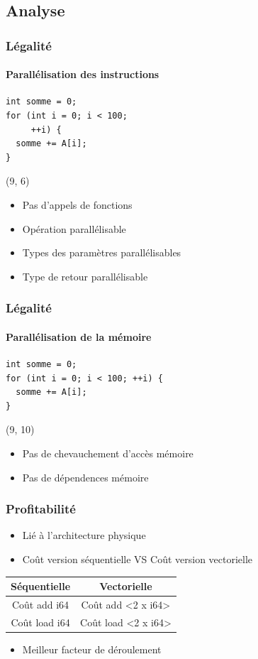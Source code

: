 \documentclass{beamer}
\begin{document}
\subsection{Analyse}
\begin{frame}[fragile]
\frametitle{Légalité}
\framesubtitle{Parallélisation des instructions}
\begin{lstlisting}
int somme = 0;
for (int i = 0; i < 100;
     ++i) {
  somme += A[i];
}
\end{lstlisting}

\begin{textblock}{6}(9, 6)
	\begin{itemize}
	\item<2->[\checkmark] Pas d'appels de fonctions
	\item<3->[\checkmark] Opération parallélisable
	\item<4->[\checkmark] Types des paramètres parallélisables
	\item<5->[\checkmark] Type de retour parallélisable
	\end{itemize}
\end{textblock}
\end{frame}

\begin{frame}[fragile]
\frametitle{Légalité}
\framesubtitle{Parallélisation de la mémoire}
\begin{lstlisting}
int somme = 0;
for (int i = 0; i < 100; ++i) {
  somme += A[i];
}
\end{lstlisting}

\begin{textblock}{6}(9, 10)
	\begin{itemize}
	\item<2->[\checkmark] Pas de chevauchement d'accès mémoire
	\item<3->[$\times$] Pas de dépendences mémoire
	\end{itemize}
\end{textblock}
\end{frame}

\begin{frame}
\frametitle{Profitabilité}
\begin{itemize}
\item Lié à l'architecture physique
\item Coût version séquentielle VS Coût version vectorielle
\end{itemize}

\begin{center}
\begin{tabular}{ | c | c | }
  \hline
  Séquentielle & Vectorielle \\
  \hline
  Coût add i64 & Coût add \textless2 x i64\textgreater \\
  \hline
  Coût load i64 & Coût load \textless2 x i64\textgreater \\
  \hline
\end{tabular}
\end{center}

\begin{itemize}
\item Meilleur facteur de déroulement
\end{itemize}
\end{frame}
\end{document}
